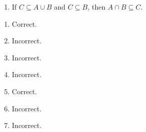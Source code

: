\begin{exercises}
\begin{problist}
\begin{enumerate}
			\item If $C \subseteq A \cup B$ and $C \subseteq B$, then $A \cap B
				\subseteq C$.
		\end{enumerate}
		\begin{solution}
			\begin{enumerate}
				\item Correct.
				\item Incorrect.
				\item Incorrect.
				\item Incorrect.
				\item Correct.
				\item Incorrect.
				\item Incorrect.
			\end{enumerate}
		\end{solution}
	\end{problist}
\end{exercises}
